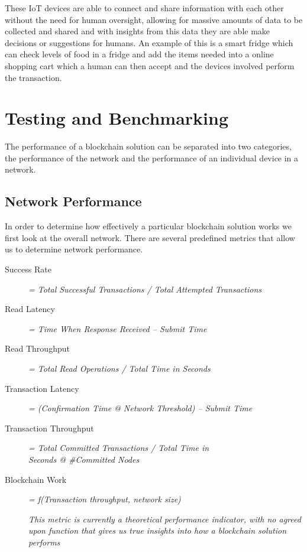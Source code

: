 These IoT devices are able to connect and share information with each other without the need for human oversight, allowing for massive amounts of data to be collected and shared and with insights from this data they are able make decisions or suggestions for humans. An example of this is a smart fridge which can check levels of food in a fridge and add the items needed into a online shopping cart which a human can then accept and the devices involved perform the transaction.


\section{Testing and Benchmarking}

The performance of a blockchain solution can be separated into two categories, the performance of the network and the performance of an individual device in a network. 

\subsection{Network Performance}

In order to determine how effectively a particular blockchain solution works we first look at the overall network. There are several predefined metrics that allow us to determine network performance\cite{Linux2018Metrics}.

\begin{description}

    \item[Success Rate]
        \textit{= Total Successful Transactions / Total Attempted Transactions}

    \item[Read Latency]
        \textit{ = Time When Response Received – Submit Time}
        
    \item[Read Throughput]
        \textit{ = Total Read Operations / Total Time in Seconds}
        
    \item[Transaction Latency]
        \textit{ = (Confirmation Time @ Network Threshold) – Submit Time}
    
    \item[Transaction Throughput]
        \textit{ = Total Committed Transactions / Total Time in \\Seconds @ \#Committed Nodes}
    
    \item[Blockchain Work]
        \textit{ =  f(Transaction throughput, network size)}
        
        \textit{This metric is currently a theoretical performance indicator, with no agreed upon function that gives us true insights into how a blockchain solution performs}

\end{description}




